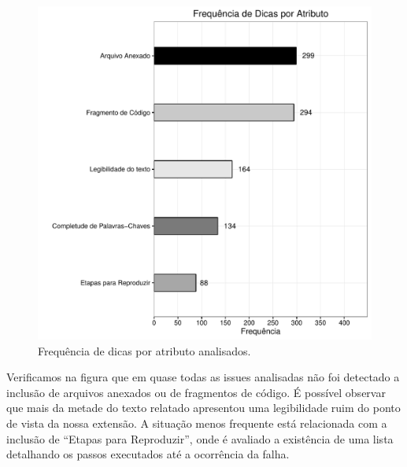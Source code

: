 \begin{figure}[htpb]
    \centering
    \includegraphics[width=0.6\linewidth]{chapter-implementacao-extensoes-fgrm/img/grafico_implementacao_extensao_freq_dicas_atributo.pdf}
    \caption{Frequência de dicas por atributo analisados.}
\label{fig:frequencia_atributos_comentario}
\end{figure}

Verificamos na figura que em quase todas as issues analisadas não foi detectado
a inclusão de arquivos anexados ou de fragmentos de código. É possível observar
que mais da metade do texto relatado apresentou uma legibilidade ruim do ponto
de vista da nossa extensão. A situação menos frequente está relacionada com a
inclusão de ``Etapas para Reproduzir'', onde é avaliado a existência de uma
lista detalhando os passos executados até a ocorrência da falha.

\begin{table}[htpb]
\centering
{}
\caption{Número de dicas retornadas pela extensão.}
\label{tab:numero_de_dicas}
\end{table}

